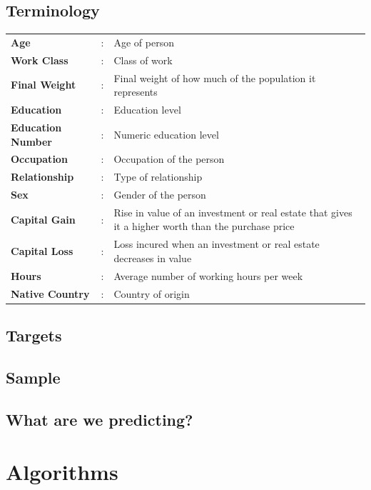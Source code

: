 \documentclass[12pt]{article}
\renewcommand{\arraystretch}{1.2}
\begin{document}
	\setlength{\arrayrulewidth}{0.0mm}
	\setlength{\tabcolsep}{15pt}
	\renewcommand{\arraystretch}{1.2}
	
	\subsection{Terminology}
	\begin{tabular}{|p{3cm}|p{1cm}|p{10cm}|}
		{\bfseries Age}&:&Age of person\\
		{\bfseries Work Class}&:&Class of work\\
		{\bfseries Final Weight}&:&Final weight of how much of the population it represents\\
		{\bfseries Education}&:&Education level\\
		{\bfseries Education Number}&:&Numeric education level\\
		{\bfseries Occupation}&:&Occupation of the person\\
		{\bfseries Relationship}&:&Type of relationship\\
		{\bfseries Sex}&:&Gender of the person\\
		{\bfseries Capital Gain}&:&Rise in value of an investment or real estate that gives it a higher worth than the purchase price\\
		{\bfseries Capital Loss}&:&Loss incured when an investment or real estate decreases in value\\
		{\bfseries Hours}&:&Average number of working hours per week\\
		{\bfseries Native Country}&:&Country of origin\\
	\end{tabular}
	
	\subsection{Targets}
	\subsection{Sample}
	\subsection{What are we predicting?}
	\newpage
	
	
	\section{Algorithms}
	
\end{document}
